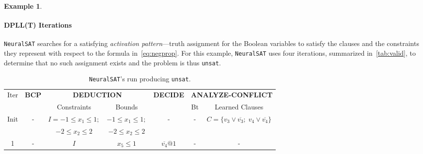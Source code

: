 \documentclass[oneside,11pt,dvipsnames]{book}
\numberwithin{equation}{section}
\theoremstyle{definition}
\newtheorem{example}{Example}[section]
\theoremstyle{remark}
\newcommand{\neuralsat}{\texttt{NeuralSAT}}
\newcommand{\unsat}{\texttt{unsat}}
\begin{document}
\begin{example}







\paragraph{DPLL(T) Iterations} \neuralsat{} searches for a satisfying \emph{activation pattern}---truth assignment for the Boolean variables to satisfy the clauses and the constraints they represent with respect to the formula in~\autoref{eq:negprop}.
For this example, \neuralsat{} uses four iterations, summarized in~\autoref{tab:valid}, to determine that no such assignment exists and the problem is thus \unsat{}.


\begin{table}
    \centering
    \caption{\neuralsat{}'s run producing \unsat{}.}\label{tab:valid}
    \footnotesize
      \begin{tabular}{ccccccc}
      \toprule
      Iter & \textbf{BCP} & \multicolumn{2}{c}{\textbf{DEDUCTION}}& \textbf{DECIDE} & \multicolumn{2}{c}{\textbf{ANALYZE-CONFLICT}} \\
        &&Constraints&Bounds&&Bt&Learned Clauses\\
        \midrule
        Init &-& $I = -1 \le x_1 \le 1; $& $-1 \le x_1 \le 1;$  & - &-&$C = \{v_3 \lor \overline{v_3};\; v_4 \lor \overline{v_4}\}$\\
        && $-2 \le x_2 \le 2$ & $-2 \le x_2\le 2$& & & \\
        1 &-&$I$ & $ x_5 \le 1 $& $\overline{v_4}@1$&-&-\\


\end{tabular}
\end{table}
\end{example}
\end{document}
